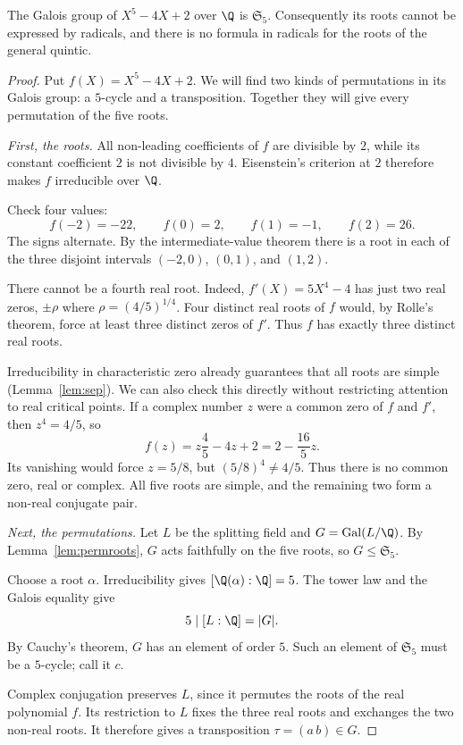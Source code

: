 \begin{theorem}\label{thm:abelruffini}
The Galois group of $X^5-4X+2$ over $\Q$ is $\mathfrak S_5$. Consequently its roots cannot be expressed by radicals, and there is no formula in radicals for the roots of the general quintic.
\end{theorem}
\begin{proof}
Put $f(X)=X^5-4X+2$. We will find two kinds of permutations in its Galois group: a $5$-cycle and a transposition. Together they will give every permutation of the five roots.

\emph{First, the roots.} All non-leading coefficients of $f$ are divisible by $2$, while its constant coefficient $2$ is not divisible by $4$. Eisenstein's criterion at $2$ therefore makes $f$ irreducible over $\Q$.

Check four values:
\[
f(-2)=-22,\qquad f(0)=2,\qquad f(1)=-1,\qquad f(2)=26.
\]
The signs alternate. By the intermediate-value theorem there is a root in each of the three disjoint intervals $(-2,0)$, $(0,1)$, and $(1,2)$.

There cannot be a fourth real root. Indeed, $f'(X)=5X^4-4$ has just two real zeros, $\pm\rho$ where $\rho=(4/5)^{1/4}$. Four distinct real roots of $f$ would, by Rolle's theorem, force at least three distinct zeros of $f'$. Thus $f$ has exactly three distinct real roots.

Irreducibility in characteristic zero already guarantees that all roots
are simple (Lemma~\ref{lem:sep}). We can also check this directly without
restricting attention to real critical points. If a complex number $z$
were a common zero of $f$ and $f'$, then $z^4=4/5$, so
\[
f(z)=z\frac45-4z+2=2-\frac{16}{5}z.
\]
Its vanishing would force $z=5/8$, but $(5/8)^4\ne4/5$.
Thus there is no common zero, real or complex. All five roots are simple,
and the remaining two form a non-real conjugate pair.

\emph{Next, the permutations.} Let $L$ be the splitting field and $G=\operatorname{Gal}(L/\Q)$. By Lemma~\ref{lem:permroots}, $G$ acts faithfully on the five roots, so $G\le\mathfrak S_5$.

Choose a root $\alpha$. Irreducibility gives $[\Q(\alpha):\Q]=5$. The tower law and the Galois equality give
\[
5\mid[L:\Q]=|G|.
\]
By Cauchy's theorem, $G$ has an element of order $5$. Such an element of $\mathfrak S_5$ must be a $5$-cycle; call it $c$.

Complex conjugation preserves $L$, since it permutes the roots of the real polynomial $f$. Its restriction to $L$ fixes the three real roots and exchanges the two non-real roots. It therefore gives a transposition $\tau=(a\,b)\in G$.


\end{proof}
